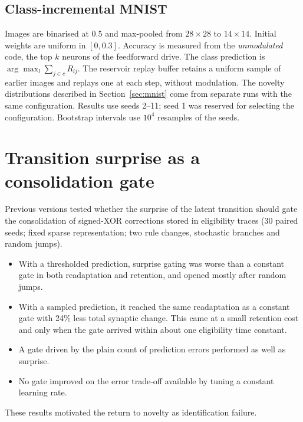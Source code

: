 \documentclass[11pt,a4paper]{article}
\begin{document}
\subsection{Class-incremental MNIST}
Images are binarised at 0.5 and max-pooled from $28\times28$ to $14\times14$. Initial weights are uniform in $[0,0.3]$. Accuracy is measured from the \emph{unmodulated} code, the top $k$ neurons of the feedforward drive. The class prediction is $\arg\max_l\sum_{j\in c}R_{lj}$. The reservoir replay buffer retains a uniform sample of earlier images and replays one at each step, without modulation. The novelty distributions described in Section~\ref{sec:mnist} come from separate runs with the same configuration. Results use seeds 2--11; seed 1 was reserved for selecting the configuration. Bootstrap intervals use $10^4$ resamples of the seeds.

\section{Transition surprise as a consolidation gate}\label{app:surprise}
Previous versions tested whether the surprise of the latent transition should gate the consolidation of signed-XOR corrections stored in eligibility traces (30 paired seeds; fixed sparse representation; two rule changes, stochastic branches and random jumps).
\begin{itemize}
\item With a thresholded prediction, surprise gating was worse than a constant gate in both readaptation and retention, and opened mostly after random jumps.
\item With a sampled prediction, it reached the same readaptation as a constant gate with 24\% less total synaptic change. This came at a small retention cost and only when the gate arrived within about one eligibility time constant.
\item A gate driven by the plain count of prediction errors performed as well as surprise.
\item No gate improved on the error trade-off available by tuning a constant learning rate.
\end{itemize}
These results motivated the return to novelty as identification failure.
\end{document}
